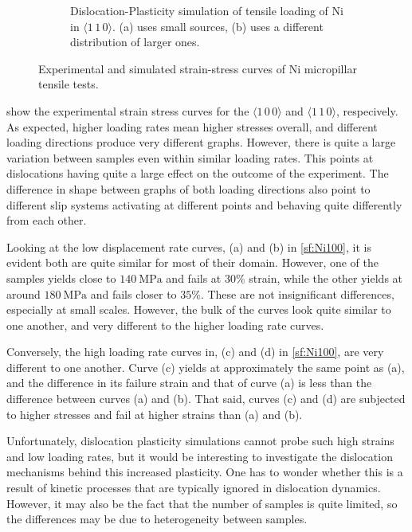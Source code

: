 \begin{figure}
\begin{subfigure}[t]{0.45\linewidth}
        \caption[Dislocation-Plasticity simulation of tensile loading of Ni in $\langle 1\, 1\, 0 \rangle$.]{Dislocation-Plasticity simulation of tensile loading of Ni  in $\langle 1\, 1\, 0 \rangle$. (a) uses small sources, (b) uses a different distribution of larger ones.}
        \label{sf:Ni110_DDD}
    \end{subfigure}
    \caption{Experimental and simulated strain-stress curves of Ni micropillar tensile tests.}
    \label{f:NiStrainStress}
\end{figure}

 show the experimental strain stress curves for the $\langle 1\,0\,0 \rangle$ and $\langle 1\,1\,0 \rangle$, respecively. As expected, higher loading rates mean higher stresses overall, and different loading directions produce very different graphs. However, there is quite a large variation between samples even within similar loading rates. This points at dislocations having quite a large effect on the outcome of the experiment. The difference in shape between graphs of both loading directions also point to different slip systems activating at different points and behaving quite differently from each other.

Looking at the low displacement rate curves, (a) and (b) in \cref{sf:Ni100}, it is evident both are quite similar for most of their domain. However, one of the samples yields close to $\SI{140}{\mega\pascal}$ and fails at $30\%$ strain, while the other yields at around $\SI{180}{\mega\pascal}$ and fails closer to $35\%$. These are not insignificant differences, especially at small scales. However, the bulk of the curves look quite similar to one another, and very different to the higher loading rate curves.

Conversely, the high loading rate curves in, (c) and (d) in \cref{sf:Ni100}, are very different to one another. Curve (c) yields at approximately the same point as (a), and the difference in its failure strain and that of curve (a) is less than the difference between curves (a) and (b). That said, curves (c) and (d) are subjected to higher stresses and fail at higher strains than (a) and (b).

Unfortunately, dislocation plasticity simulations cannot probe such high strains and low loading rates, but it would be interesting to investigate the dislocation mechanisms behind this increased plasticity. One has to wonder whether this is a result of kinetic processes that are typically ignored in dislocation dynamics. However, it may also be the fact that the number of samples is quite limited, so the differences may be due to heterogeneity between samples.

